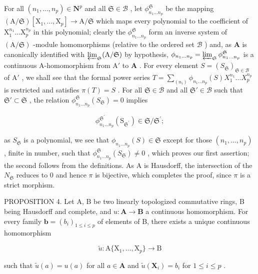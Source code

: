 For all \((n_1, \ldots, n_p) \in \mathbf{N}^p\) and all \(\mathfrak{S} \in \mathcal{B}\) , let \(\phi_{n_1 \ldots n_p}^{\mathfrak{S}}\) be the mapping \((\mathrm{A} / \mathfrak{S})[\mathrm{X}_1, \ldots, \mathrm{X}_p] \to \mathrm{A} / \mathfrak{S}\) which maps every polynomial to the coefficient of \(\mathrm{X}_1^{n_1} \ldots \mathrm{X}_p^{n_p}\) in this polynomial; clearly the \(\phi_{n_1 \ldots n_p}^{\mathfrak{S}}\) form an inverse system of \((\mathrm{A} / \mathfrak{S})\) -module homomorphisms (relative to the ordered set \(\mathcal{B}\) ) and, as \(\mathbf{A}\) is canonically identified with \(\varprojlim_{\mathfrak{S}} (\mathrm{A} / \mathfrak{S})\) by hypothesis, \(\phi_{n_1 \ldots n_p} = \varprojlim_{\mathfrak{S}} \phi_{n_1 \ldots n_p}^{\mathfrak{S}}\) is a continuous A-homomorphism from \(\mathrm{A}'\) to \(\mathbf{A}\) . For every element \(S = (S_{\mathfrak{S}})_{\mathfrak{S} \in \mathcal{B}}\) of \(\mathrm{A}'\) , we shall see that the formal power series \(T = \sum_{(n_i)} \phi_{n_1 \ldots n_p}(S) X_1^{n_1} \ldots X_p^{n_p}\) is restricted and satisfies \(\pi(T) = S\) . For all \(\mathfrak{S} \in \mathcal{B}\) and all \(\mathfrak{S}' \in \mathcal{B}\) such that \(\mathfrak{S}' \subset \mathfrak{S}\) , the relation \(\phi_{n_1 \ldots n_p}^{\mathfrak{S}}(S_{\mathfrak{S}}) = 0\) implies

\[
\phi_ {n _ {1} \dots n _ {p}} ^ {\mathfrak {S} ^ {\prime}} (\mathrm{S} _ {\mathfrak {S} ^ {\prime}}) \in \mathfrak {S} / \mathfrak {S} ^ {\prime};
\]

as \(S_{\mathfrak{S}}\) is a polynomial, we see that \(\phi_{n_{1}\ldots n_{p}}(S) \in \mathfrak{S}\) except for those \((n_{1}, \ldots, n_{p})\) , finite in number, such that \(\phi_{n_{1}\ldots n_{p}}^{\mathfrak{S}}(S_{\mathfrak{S}}) \neq 0\) , which proves our first assertion; the second follows from the definitions. As A is Hausdorff, the intersection of the \(N_{\mathfrak{S}}\) reduces to 0 and hence \(\pi\) is bijective, which completes the proof, since \(\pi\) is a strict morphism.

PROPOSITION 4. Let A, B be two linearly topologized commutative rings, B being Hausdorff and complete, and \(u: \mathbf{A} \to \mathbf{B}\) a continuous homomorphism. For every family \(\mathbf{b} = (b_i)_{1 \leq i \leq p}\) of elements of B, there exists a unique continuous homomorphism

\[
\tilde {u} \colon \mathrm{A} \{\mathrm{X} _ {1}, \dots , \mathrm{X} _ {p} \} \rightarrow \mathrm{B}
\]

such that \(\tilde{u}(a) = u(a)\) for all \(a \in \mathbf{A}\) and \(\tilde{u}(\mathbf{X}_i) = b_i\) for \(1 \leqslant i \leqslant p\) .

